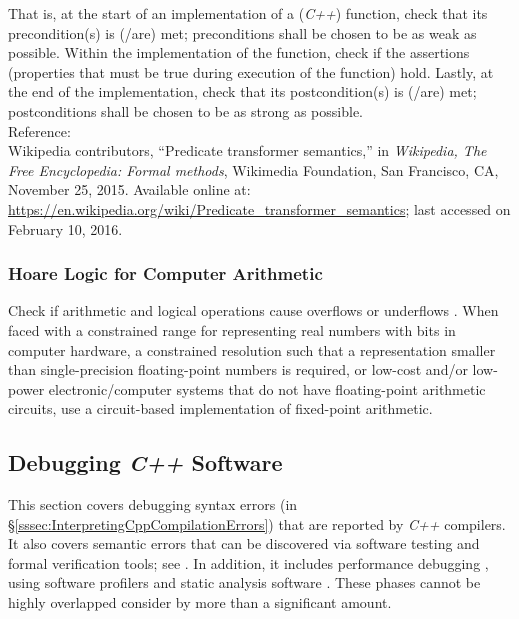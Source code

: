 	That is, at the start of an implementation of a ({\it C++}) function, check that its precondition(s) is (/are) met; preconditions shall be chosen to be as weak as possible. Within the implementation of the function, check if the assertions (properties that must be true during execution of the function) hold. Lastly, at the end of the implementation, check that its postcondition(s) is (/are) met; postconditions shall be chosen to be as strong as possible. \\

Reference: \\
Wikipedia contributors, ``Predicate transformer semantics,'' in {\it Wikipedia, The Free Encyclopedia: Formal methods}, Wikimedia Foundation, San Francisco, CA, November 25, 2015. Available online at: \url{https://en.wikipedia.org/wiki/Predicate_transformer_semantics}; last accessed on February 10, 2016.



\subsubsection{Hoare Logic for Computer Arithmetic}
\label{sssec:HoareLogicForComputerArithmetic}

	Check if arithmetic and logical operations cause overflows or underflows \cite{Crowl2015,Crowl2012}. When faced with a constrained range for representing real numbers with bits in computer hardware, a constrained resolution such that a representation smaller than single-precision floating-point numbers is required, or low-cost and/or low-power electronic/computer systems that do not have floating-point arithmetic circuits, use a circuit-based implementation of fixed-point arithmetic.



\subsection{Debugging {\it C++} Software}
\label{ssec:DebuggingCppSoftware}

	This section covers debugging syntax errors (in \S\ref{sssec:InterpretingCppCompilationErrors}) that are reported by {\it C++} compilers. It also covers semantic errors that can be discovered via software testing and formal verification tools; see \cite[\S4.4, pp. 119]{Pradhan2009}. In addition, it includes performance debugging \cite[\S4.5, pp. 119--120]{Pradhan2009}, using software profilers \cite[Figure 7.1, pp. 292; and \S7.2.10, pp. 302]{Fisher2005} \cite[pp. 148]{Kernighan1999} \cite[pp. 35-9 -- 35-10]{Lee2008b} \cite[\S3.2, pp. 16--18]{Fog2014c} \cite[\S3.3.2, pp. 21--22; pp. 23; Figure 40, pp. 102; Appendix C, \S C.1.7, pp. 104]{Baik2013} and static analysis software \cite[\S5.4, 65-66; and Figure 40, pp. 102]{Baik2013} \cite{Adve1997} \cite[\S7.1, 176--183]{Bailey2007} \cite[\S5.2.4, pp. 82--83; and \S5.4.2, pp. 90--92]{Debbabi2010} \cite[Chapter 7, pp. 109--117]{Ford2008} \cite[\S35.5, pp. 35-10 -- 35-14]{Lee2008b} \cite{Boulanger2013}. These phases cannot be highly overlapped consider by more than a significant amount.
\ \\

